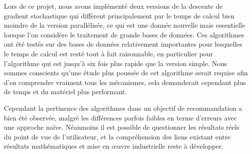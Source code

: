 \documentclass[10pt,a4paper]{article}
\begin{document}
Lors de ce projet, nous avons implémenté deux versions de la descente de gradient stochastique qui diffèrent principalement par le temps de calcul bien moindre de la version parallélisée, ce qui est une donnée nouvelle mais essentielle lorsque l'on considère le traitement de grande bases de données. Ces algorithmes ont été testés sur des bases de données relativement importantes pour lesquelles le temps de calcul est resté tout à fait raisonnable, en particulier pour l'algorithme \jel qui est jusqu'à six fois plus rapide que la version simple. Nous sommes conscients qu'une étude plus poussée de cet algorithme serait requise afin d'en comprendre vraiment tous les mécanismes, cela demanderait cependant plus de temps et du matériel plus performant. 

Cependant la pertinence des algorithmes dans un objectif de recommandation a bien été observée, malgré les différences parfois faibles en terme d'erreurs avec une approche naïve. Néanmoins il est possible de questionner les résultats réels du point de vue de l'utilisateur, et la compréhension des liens existant entre résultats mathématiques et mise en œuvre industrielle reste à développer.

\newpage


\end{document}
